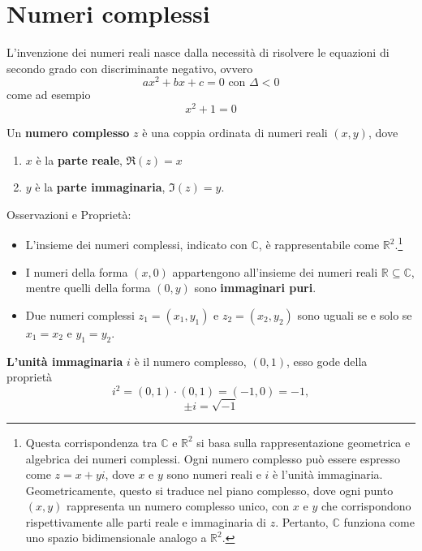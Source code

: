 \documentclass{book}
\begin{document}
\section{Numeri complessi}
L'invenzione dei numeri reali nasce dalla necessità di risolvere le equazioni di secondo grado con discriminante negativo, ovvero
\[ax^2 + bx + c = 0 \text{ con } \Delta < 0\]
come ad esempio
\[x^2 + 1 = 0\]
\noindent\begin{minipage}{\textwidth}
    \begin{definition}
        Un \textbf{numero complesso} \( z \) è una coppia ordinata di numeri reali \( (x, y) \), dove
        \begin{enumerate}
            \item \( x \) è la \textbf{parte reale}, \( \Re(z) = x \)
            \item \( y \) è la \textbf{parte immaginaria}, \( \Im(z) = y \).
        \end{enumerate}
        \noindent Osservazioni e Proprietà:
        \begin{itemize}
            \item  L'insieme dei numeri complessi, indicato con \( \mathbb{C} \), è rappresentabile come \( \mathbb{R}^2 \).\footnote{Questa corrispondenza tra \( \mathbb{C} \) e \( \mathbb{R}^2 \) si basa sulla rappresentazione geometrica e algebrica dei numeri complessi. Ogni numero complesso può essere espresso come \( z = x + yi \), dove \( x \) e \( y \) sono numeri reali e \( i \) è l'unità immaginaria. Geometricamente, questo si traduce nel piano complesso, dove ogni punto \( (x, y) \) rappresenta un numero complesso unico, con \( x \) e \( y \) che corrispondono rispettivamente alle parti reale e immaginaria di \( z \). Pertanto, \( \mathbb{C} \) funziona come uno spazio bidimensionale analogo a \( \mathbb{R}^2 \).}
            \item   I numeri della forma \( (x, 0) \) appartengono all'insieme dei numeri reali \( \mathbb{R} \subseteq \mathbb{C} \), mentre quelli della forma \( (0, y) \) sono \textbf{immaginari puri}.
            \item Due numeri complessi \( z_1 = (x_1, y_1) \) e \( z_2 = (x_2, y_2) \) sono uguali se e solo se \( x_1 = x_2 \) e \( y_1 = y_2 \).
        \end{itemize}
    \end{definition}
\end{minipage}
\begin{definition}
    \textbf{L'unità immaginaria} \(i\) è il numero complesso, \((0, 1)\), esso gode della proprietà
    \[ i^2 = (0,1)\cdot(0,1) = (-1,0) = -1, \]
    \[ \pm i = \sqrt{-1} \]
\end{definition}
\end{document}

